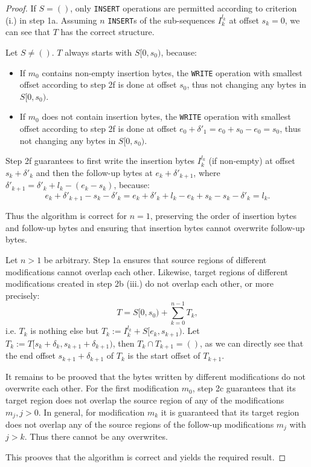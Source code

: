 \documentclass[english, 10pt, openright, twocolumn, landscape, twoside, notitlepage, a4paper, pdftex]		
{article}
\begin{document}
\begin{proof}
If $S=()$, only \texttt{INSERT} operations are permitted according to criterion (i.) in step 1a. Assuming $n$ \texttt{INSERT}s of the sub-sequences $I_{k}^{l_{k}}$ at offset $s_{k}=0$, we can see that $T$ has the correct structure.

Let $S\neq()$. $T$ always starts with $S[0,s_{0})$, because:
\begin{itemize}
\item If $m_{0}$ contains non-empty insertion bytes, the \texttt{WRITE} operation with smallest offset according to step 2f is done at offset $s_{0}$, thus not changing any bytes in $S[0,s_{0})$.
\item If $m_{0}$ does not contain insertion bytes, the \texttt{WRITE} operation with smallest offset according to step 2f is done at offset $e_{0}+\delta'_{1}=e_{0}+s_{0}-e_{0}=s_{0}$, thus not changing any bytes in $S[0,s_{0})$.
\end{itemize}

Step 2f guarantees to first write the insertion bytes $I_{k}^{l_{k}}$ (if non-empty) at offset $s_{k}+\delta'_{k}$ and then the follow-up bytes at $e_{k}+\delta'_{k+1}$, where $\delta'_{k+1}=\delta'_{k}+l_{k}-(e_{k}-s_{k})$, because:
\[e_{k}+\delta'_{k+1}-s_{k}-\delta'_{k}=e_{k}+\delta'_{k}+l_{k}-e_{k}+s_{k}-s_{k}-\delta'_{k}=l_{k}.\]

Thus the algorithm is correct for $n=1$, preserving the order of insertion bytes and follow-up bytes and ensuring that insertion bytes cannot overwrite follow-up bytes.

Let $n>1$ be arbitrary. Step 1a ensures that source regions of different modifications cannot overlap each other. Likewise, target regions of different modifications created in step 2b (iii.) do not overlap each other, or more precisely: 
\[T=S[0,s_{0})+\sum_{k=0}^{n-1}{T_{k}},\]
i.e. $T_{k}$ is nothing else but $T_{k}:=I_{k}^{l_{k}}+S[e_{k},s_{k+1})$. Let $T_{k}:=T[s_{k}+\delta_{k},s_{k+1}+\delta_{k+1})$, then $T_{k}\cap T_{k+1} = ()$, as we can directly see that the end offset $s_{k+1}+\delta_{k+1}$ of $T_{k}$ is the start offset of $T_{k+1}$.

It remains to be prooved that the bytes written by different modifications do not overwrite each other. For the first modification $m_{0}$, step 2c guarantees that its target region does not overlap the source region of any of the modifications $m_{j},j>0$. In general, for modification $m_{k}$ it is guaranteed that its target region does not overlap any of the source regions of the follow-up modifications $m_{j}$ with $j>k$. Thus there cannot be any overwrites.

This prooves that the algorithm is correct and yields the required result.\end{proof}
\end{document}

